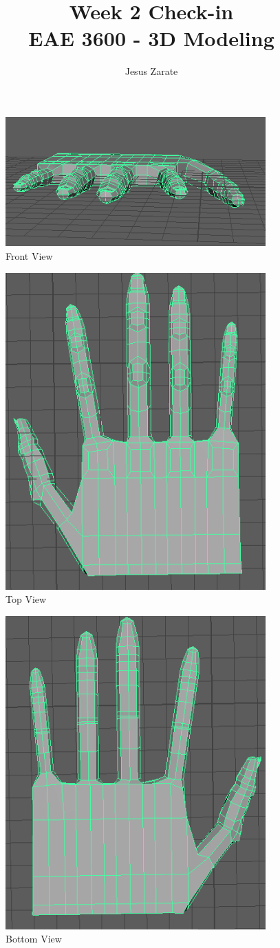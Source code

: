 \documentclass[a4paper]{article}
\title{
  Week 2 Check-in\\
  \large EAE 3600 - 3D Modeling}
\author{Jesus Zarate}
\begin{document}
\maketitle

\begin{figure}[h]
\centering
\includegraphics[width=10cm]{img/front.png}
\caption{Front View}
\label{fig:Side View}
\end{figure}

\begin{figure}[h]
\centering
\includegraphics[width=10cm]{img/top.png}
\caption{Top View}
\label{fig:Top View}
\end{figure}


\begin{figure}[h]
\centering
\includegraphics[width=10cm]{img/bottom.png}
\caption{Bottom View}
\label{fig:Bottom View}
\end{figure}
\end{document}
